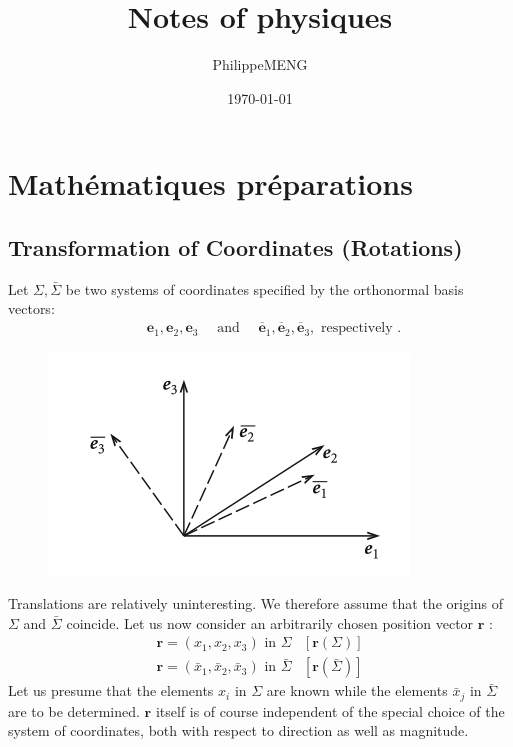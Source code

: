 \documentclass[12pt]{book}
\title{Notes of physiques}
\author{PhilippeMENG}
\date{\today}
\theoremstyle{definition}\newtheorem{dfn}{Définition}[chapter]
\theoremstyle{plain}\newtheorem{thm}{Théorème}[chapter]
\theoremstyle{plain}\newtheorem{prp}{Proposition}[chapter]
\theoremstyle{plain}\newtheorem{lem}{\bf Lemme}[chapter]
\theoremstyle{plain}\newtheorem{axm}{\bf Axiome}[chapter]
\theoremstyle{plain}\newtheorem{lmm}{\bf Lemme}[chapter]
\theoremstyle{plain}\newtheorem{cor}{\bf Corollaire}[chapter]
\theoremstyle{remark}\newtheorem{rem}{Remarque}[chapter]
\begin{document}
\maketitle
\tableofcontents
\chapter{Mathématiques préparations}
\section{Transformation of Coordinates (Rotations)}
Let $\Sigma, \bar{\Sigma}$ be two systems of coordinates specified by the orthonormal basis vectors:
$$
\begin{array}{l}
\qquad \mathbf{e}_{1}, \mathbf{e}_{2}, \mathbf{e}_{3} \quad \text { and } \quad \overline{\mathbf{e}}_{1}, \overline{\mathbf{e}}_{2}, \overline{\mathbf{e}}_{3}, \text { respectively }.
\end{array}
$$
\begin{figure}[H]
	\centering
	\includegraphics[scale=1]{image//Mathematiques preparations//Transformation of Coordinates (Rotations)//1}
\end{figure}

Translations are relatively uninteresting. We therefore assume that the origins of $\Sigma$ and $\bar{\Sigma}$ coincide. Let us now consider an arbitrarily chosen position vector $\mathbf{r}$ :
$$
\begin{array}{ll}
\mathbf{r}=\left(x_{1}, x_{2}, x_{3}\right) \text { in } \Sigma & {[\mathbf{r}(\Sigma)]} \\
\mathbf{r}=\left(\bar{x}_{1}, \bar{x}_{2}, \bar{x}_{3}\right) \text { in } \bar{\Sigma} & {[\mathbf{r}(\bar{\Sigma})]}
\end{array}
$$
Let us presume that the elements $x_{i}$ in $\Sigma$ are known while the elements $\bar{x}_{j}$ in $\bar{\Sigma}$ are to be determined. $\mathbf{r}$ itself is of course independent of the special choice of the system of coordinates, both with respect to direction as well as magnitude.
\end{document}
